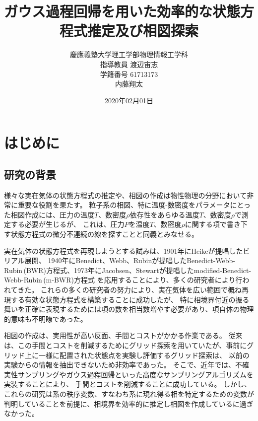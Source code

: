 \documentclass[titlepage]{jsreport}
\title{ガウス過程回帰を用いた効率的な状態方程式推定及び相図探索}
\author{慶應義塾大学理工学部物理情報工学科\\
指導教員 渡辺宙志\\
学籍番号 61713173\\
内藤翔太}
\date{2020年02月01日}
\begin{document}
\maketitle

\tableofcontents




\chapter{はじめに} \label{chap:introduction}




\section{研究の背景} \label{intro-background}
様々な実在気体の状態方程式の推定や、相図の作成は物性物理の分野において非常に重要な役割を果たす。
粒子系の相図、特に温度-数密度をパラメータにとった相図作成には、圧力の温度$T$、数密度$\rho$依存性をあらゆる温度$T$、数密度$\rho$で測定する必要が生じるが、
これは、圧力$P$を温度$T$、数密度$\rho$に関する項で書き下す状態方程式の微分不連続の線を探すことと同義とみなせる。

実在気体の状態方程式を再現しようとする試みは、1901年にHeikeが提唱したビリアル展開\cite{virial-Heike}、
1940年にBenedict、Webb、Rubinが提唱したBenedict-Webb-Rubin\,(BWR)方程式\cite{BWR-equation:original}、1973年にJacobsen、Stewartが提唱したmodified-Benedict-Webb-Rubin\,(m-BWR)方程式\cite{m-BWR-equation}
を応用することにより、多くの研究者により行われてきた\cite{MCCARTY1974276,BWR-equation:13,BWR-equation:25}。
これらの多くの研究者の努力により、実在気体を広い範囲で概ね再現する有効な状態方程式を構築することに成功したが、
特に相境界付近の振る舞いを正確に表現するためには項の数を相当数増やす必要があり、項自体の物理的意味も不明瞭であった。

相図の作成は、実用性が高い反面、手間とコストがかかる作業である。
従来は、この手間とコストを削減するためにグリッド探索\cite{grid1,grid2}を用いていたが、事前にグリッド上に一様に配置された状態点を実験し評価するグリッド探索は、
以前の実験からの情報を抽出できないため非効率であった。
そこで、近年では、不確実性サンプリング\cite{uncertainty-sampling1,uncertainty-sampling2}やガウス過程回帰\cite{gaussian-phase}といった高度なサンプリングアルゴリズムを実装することにより、
手間とコストを削減することに成功している。
しかし、これらの研究は系の秩序変数、すなわち系に現れ得る相を特定するための変数が判明していることを前提に、相境界を効率的に推定し相図を作成しているに過ぎなかった。
\end{document}
